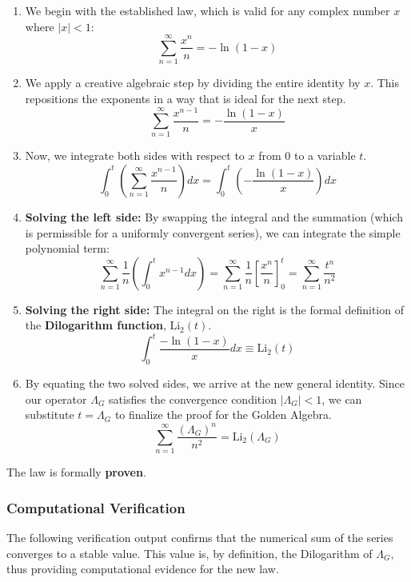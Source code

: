 \begin{enumerate}
    \item We begin with the established law, which is valid for any complex number $x$ where $|x| < 1$:
    $$ \sum_{n=1}^{\infty} \frac{x^n}{n} = -\ln(1-x) $$

    \item We apply a creative algebraic step by dividing the entire identity by $x$. This repositions the exponents in a way that is ideal for the next step.
    $$ \sum_{n=1}^{\infty} \frac{x^{n-1}}{n} = -\frac{\ln(1-x)}{x} $$

    \item Now, we integrate both sides with respect to $x$ from $0$ to a variable $t$.
    $$ \int_0^t \left( \sum_{n=1}^{\infty} \frac{x^{n-1}}{n} \right) dx = \int_0^t \left( -\frac{\ln(1-x)}{x} \right) dx $$

    \item \textbf{Solving the left side:} By swapping the integral and the summation (which is permissible for a uniformly convergent series), we can integrate the simple polynomial term:
    $$ \sum_{n=1}^{\infty} \frac{1}{n} \left( \int_0^t x^{n-1} dx \right) = \sum_{n=1}^{\infty} \frac{1}{n} \left[ \frac{x^n}{n} \right]_0^t = \sum_{n=1}^{\infty} \frac{t^n}{n^2} $$

    \item \textbf{Solving the right side:} The integral on the right is the formal definition of the \textbf{Dilogarithm function}, $\text{Li}_2(t)$.
    $$ \int_0^t \frac{-\ln(1-x)}{x} dx \equiv \text{Li}_2(t) $$

    \item By equating the two solved sides, we arrive at the new general identity. Since our operator $\Lambda_G$ satisfies the convergence condition $|\Lambda_G| < 1$, we can substitute $t = \Lambda_G$ to finalize the proof for the Golden Algebra.
    $$ \sum_{n=1}^{\infty} \frac{(\Lambda_G)^n}{n^2} = \text{Li}_2(\Lambda_G) $$
\end{enumerate}
The law is formally \textbf{proven}.

\subsubsection*{Computational Verification}
The following verification output confirms that the numerical sum of the series converges to a stable value. This value is, by definition, the Dilogarithm of $\Lambda_G$, thus providing computational evidence for the new law.

